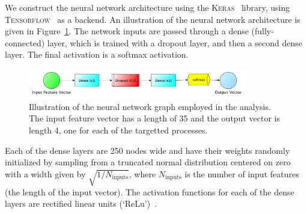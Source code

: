 
We construct the neural network architecture using the \textsc{Keras}~\cite{chollet2015keras}
library, using \textsc{Tensorflow}~\cite{tensorflow2015} as a backend.
An illustration of the neural network architecture is given in Figure~\ref{fig:nn_arch}.
The network inputs are passed through a dense (fully-connected) layer,  which
is trained with a dropout layer, and then a second dense layer.
The final activation is a softmax activation.

\begin{figure}[!htb]
    \begin{center}
        \includegraphics[width=0.85\textwidth]{figures/search_hh/mva/nn_arch_graph_updated}
        \caption{
            Illustration of the neural network graph employed in the analysis.
            The input feature vector has a length of 35 and the output vector is length 4,
            one for each of the targetted processes.
        }
        \label{fig:nn_arch}
    \end{center}
\end{figure}
Each of the dense layers are 250 nodes wide and  have their weights randomly initialized by sampling
from a truncated normal distribution centered on zero with a width given by $\sqrt{1/N_{\text{inputs}}}$, where
$N_{\text{inputs}}$ is the number of input features (the length of the input vector).
The activation functions for each of the dense layers are rectified linear units (`ReLu')~\cite{ReLu}.

